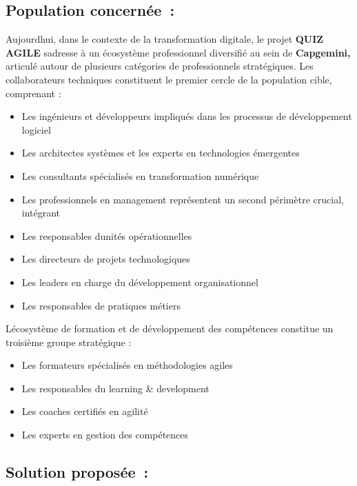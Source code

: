 \documentclass[12pt,a4paper,twoside]{report}
\begin{document}
\hypertarget{population-concernuxe9e}{%
\subsection{Population concernée~:}\label{population-concernuxe9e}}

Aujourd\textquotesingle hui, dans le contexte de la transformation
digitale, le projet \textbf{QUIZ AGILE} s\textquotesingle adresse à un
écosystème professionnel diversifié au sein de \textbf{Capgemini,}
articulé autour de plusieurs catégories de professionnels stratégiques.
Les collaborateurs techniques constituent le premier cercle de la
population cible, comprenant :

\begin{itemize}
\item
  Les ingénieurs et développeurs impliqués dans les processus de
  développement logiciel
\item
  Les architectes systèmes et les experts en technologies émergentes
\item
  Les consultants spécialisés en transformation numérique
\item
  Les professionnels en management représentent un second périmètre
  crucial, intégrant
\item
  Les responsables d\textquotesingle unités opérationnelles
\item
  Les directeurs de projets technologiques
\item
  Les leaders en charge du développement organisationnel
\item
  Les responsables de pratiques métiers
\end{itemize}

L\textquotesingle écosystème de formation et de développement des
compétences constitue un troisième groupe stratégique :

\begin{itemize}
\item
  Les formateurs spécialisés en méthodologies agiles
\item
  Les responsables du learning \& development
\item
  Les coaches certifiés en agilité
\item
  Les experts en gestion des compétences
\end{itemize}

\hypertarget{solution-proposuxe9e}{%
\subsection{Solution proposée~:}\label{solution-proposuxe9e}}
\end{document}

